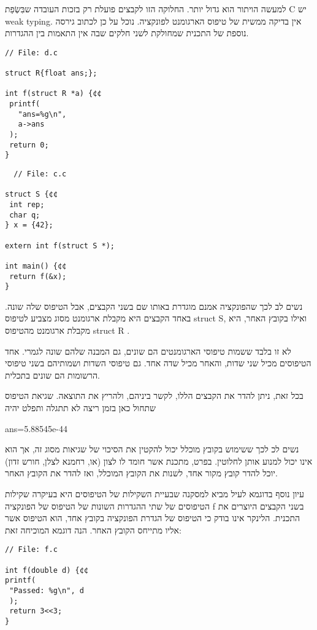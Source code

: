       למעשה הויתור הוא גדול יותר. החלוקה הזו לקבצים פועלת רק בזכות העובדה שבִּשְׂפַת C יש weak typing. אין בדיקה ממשית של טיפוס הארגומנט לפונקציה. נוכל על כן לכתוב גירסה נוספת של התכנית שמחולקת לשני חלקים שבה אין התאמות בין ההגדרות.

\begin{verbatim}
// File: d.c

struct R{float ans;};

int f(struct R *a) {¢¢
 printf(
   "ans=%g\n",
   a->ans
 );
 return 0;
}
\end{verbatim}

\begin{verbatim}
  // File: c.c

struct S {¢¢
 int rep;
 char q;
} x = {42};

extern int f(struct S *);

int main() {¢¢
 return f(&x);
}
\end{verbatim}

      נשים לב לכך שהפונקציה אמנם מוגדרת באותו שם בשני הקבצים, אבל הטיפוס שלה שונה.
      באחד הקבצים היא מקבלת ארגומנט מסוג מצביע לטיפוס struct S, ואילו בקובץ האחר, היא
      מקבלת ארגומנט מהטיפוס struct R .

      לא זו בלבד ששמות טיפוסי הארגומנטים הם שונים, גם המבנה שלהם שונה לגמרי. אחד
      הטיפוסים מכיל שני שדות, והאחר מכיל שדה אחד. גם טיפוסי השדות ושמותיהם בשני
      טיפוסי הרשומות הם שונים בתכלית.

      בכל זאת, ניתן להדר את הקבצים הללו, לקשר ביניהם, ולהריץ את התוצאה. שגיאת הטיפוס
      שתחול כאן בזמן ריצה לא תתגלה ותפלט יהיה

      ans=5.88545e-44

      נשים לכ לכך ששימוש בקובץ מוכלל יכול להקטין את הסיכוי של שגיאות מסוג זה, אך הוא
      אינו יכול למנוע אותן לחלוטין. בפרט, מתכנת אשר חומד לו לצון (או, רחמנא לצלן,
      חורש זדון) יוכל להדר קובץ מקור אחד, לשנות את הקובץ המוכלל, ואז להדר את הקובץ
      האחר.

      עיון נוסף בדוגמא לעיל מביא למסקנה שבעיית השקילות של הטיפוסים היא בעיקרה שקילות
      הטיפוסים של שתי ההגדרות השונות של הטיפוס של הפונקציה f בשני הקבצים היוצרים את
      התכנית. הלינקר אינו בודק כי הטיפוס של הגדרת הפונקציה בקובץ אחד, הוא הטיפוס אשר
      אליו מתייחס הקובץ האחר. הנה דוגמא המוכיחה זאת:

\begin{verbatim}
// File: f.c

int f(double d) {¢¢
printf(
 "Passed: %g\n", d
 );
 return 3<<3;
}
\end{verbatim}

